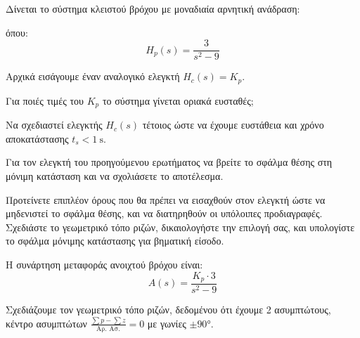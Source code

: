 \documentclass[11pt,a4paper,notitlepage,fleqn,final]{article}
\begin{document}
\begin{exercise}
Δίνεται το σύστημα κλειστού βρόχου με μοναδιαία αρνητική ανάδραση:


όπου:
\[
H_p(s) = \frac{3}{s^2-9}
\]

\begin{enumgreekparen}
	\item Αρχικά εισάγουμε έναν αναλογικό ελεγκτή \( H_c(s) = K_p \).
	
	Για ποιές τιμές του \( K_p \) το σύστημα γίνεται οριακά ευσταθές;
	
	\item Να σχεδιαστεί ελεγκτής \( H_c(s) \) τέτοιος ώστε να έχουμε ευστάθεια και χρόνο
	αποκατάστασης \( t_s < \SI{1}{\second} \).
	
	\item Για τον ελεγκτή του προηγούμενου ερωτήματος να βρείτε το σφάλμα θέσης στη μόνιμη
	κατάσταση και να σχολιάσετε το αποτέλεσμα.
	
	\item Προτείνετε επιπλέον όρους που θα πρέπει να εισαχθούν στον ελεγκτή ώστε να
	μηδενιστεί το σφάλμα θέσης, και να διατηρηθούν οι υπόλοιπες προδιαγραφές.
	Σχεδιάστε το γεωμετρικό τόπο ριζών, δικαιολογήστε την επιλογή σας, και υπολογίστε το
	σφάλμα μόνιμης κατάστασης για βηματική είσοδο.
\end{enumgreekparen}

\tcblower
\begin{enumgreekparen}
	\item Η συνάρτηση μεταφοράς ανοιχτού βρόχου είναι:\[
	A(s) = \frac{K_p\cdot 3}{s^2-9}
	\]
	
	Σχεδιάζουμε τον γεωμετρικό τόπο ριζών, δεδομένου ότι έχουμε 2 ασυμπτώτους, κέντρο
	ασυμπτώτων \( \frac{\sum p -\sum z}{\text{Αρ. Ασ.}} = 0 \) με γωνίες \( \pm \ang{90} \).
	

\end{enumgreekparen}
\end{exercise}
\end{document}
